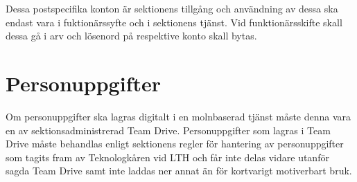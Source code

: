 \documentclass[10pt]{article}
\begin{document}
    Dessa postspecifika konton är sektionens tillgång och användning av dessa ska endast vara i fuktionärssyfte och i sektionens tjänst. 
    Vid funktionärsskifte skall dessa gå i arv och lösenord på respektive konto skall bytas. 
    
    \vspace{6px}
    \section{Personuppgifter}
    \vspace{6px}
    Om personuppgifter ska lagras digitalt i en molnbaserad tjänst måste denna vara en av sektionsadministrerad Team Drive. 
    Personuppgifter som lagras i Team Drive måste behandlas enligt sektionens regler för hantering av personuppgifter som tagits fram av Teknologkåren vid LTH och får inte delas vidare utanför sagda Team Drive samt inte laddas ner annat än för kortvarigt motiverbart bruk.
\end{document}
